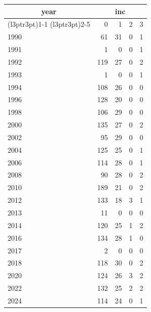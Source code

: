 \footnotesize\begin{tabular}[t]{lrrrr}
\toprule
\multicolumn{1}{c}{year} & \multicolumn{4}{c}{inc} \\
\cmidrule(l{3pt}r{3pt}){1-1} \cmidrule(l{3pt}r{3pt}){2-5}
  & 0 & 1 & 2 & 3\\
\midrule
1990 & 61 & 31 & 0 & 1\\
1991 & 1 & 0 & 0 & 1\\
1992 & 119 & 27 & 0 & 2\\
1993 & 1 & 0 & 0 & 1\\
1994 & 108 & 26 & 0 & 0\\
1996 & 128 & 20 & 0 & 0\\
1998 & 106 & 29 & 0 & 0\\
2000 & 135 & 27 & 0 & 2\\
2002 & 95 & 29 & 0 & 0\\
2004 & 125 & 25 & 0 & 1\\
2006 & 114 & 28 & 0 & 1\\
2008 & 90 & 28 & 0 & 2\\
2010 & 189 & 21 & 0 & 2\\
2012 & 133 & 18 & 3 & 1\\
2013 & 11 & 0 & 0 & 0\\
2014 & 120 & 25 & 1 & 2\\
2016 & 134 & 28 & 1 & 0\\
2017 & 2 & 0 & 0 & 0\\
2018 & 118 & 30 & 0 & 2\\
2020 & 124 & 26 & 3 & 2\\
2022 & 132 & 25 & 2 & 2\\
2024 & 114 & 24 & 0 & 1\\
\bottomrule
\end{tabular}
